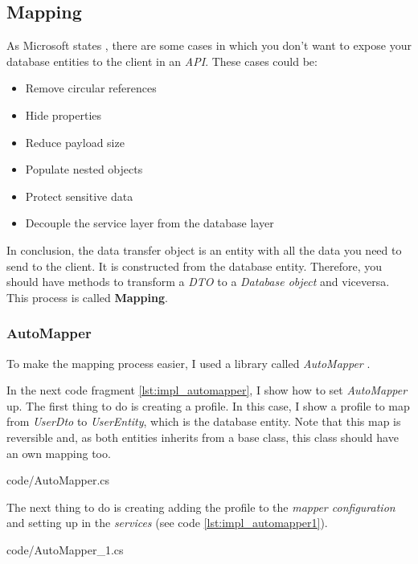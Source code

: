     \subsection{Mapping}
        As Microsoft states \cite{DTO}, there are some cases in which you don't want to expose your database entities to the client in an \textit{API}. These cases could be:
        \begin{itemize}[noitemsep]
            \item Remove circular references
            \item Hide properties 
            \item Reduce payload size
            \item Populate nested objects 
            \item Protect sensitive data
            \item Decouple the service layer from the database layer
        \end{itemize}

        In conclusion, the data transfer object is an entity with all the data you need to send to the client. It is constructed from the database entity. 
        Therefore, you should have methods to transform a \textit{DTO} to a \textit{Database object} and viceversa. This process is called \textbf{Mapping}.

        \subsubsection{AutoMapper}
            To make the mapping process easier, I used a library called \textit{AutoMapper} \cite{AutoMapper}.

            In the next code fragment \ref{lst:impl_automapper}, I show how to set \textit{AutoMapper} up. 
            The first thing to do is creating a profile. In this case, I show a profile to map from \textit{UserDto} to \textit{UserEntity}, which is the database entity. 
            Note that this map is reversible and, as both entities inherits from a base class, this class should have an own mapping too. 
            
            {code/AutoMapper.cs}
            
            The next thing to do is creating adding the profile to the \textit{mapper configuration} and setting up in the \textit{services} (see code \ref{lst:impl_automapper1}).
            
            {code/AutoMapper_1.cs}

